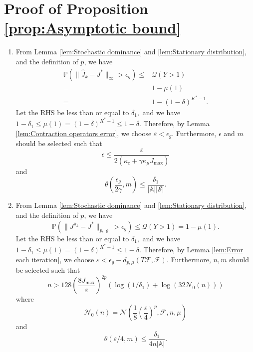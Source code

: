 \documentclass[12pt,technote,onecolumn]{IEEEtran}
\begin{document}
\section*{Proof of Proposition \ref{prop:Asymptotic bound}}
\begin{IEEEproof}
	\begin{enumerate}
		\item From Lemma \ref{lem:Stochastic dominance} and \ref{lem:Stationary distribution},
		and the definition of $p$, we have
		\begin{equation*}
		\begin{aligned}
		\mathbb{P}\left(\|\widehat{J}_{k}-J^{*}\|_{\infty}>\epsilon_{g}\right)
		\leq&\mathcal{\mathcal{Q}}\left(Y>1\right)\\
		=&1-\mu\left(1\right)\\
		=&1-\left(1-\delta\right)^{K^{*}-1}.
		\end{aligned}
		\end{equation*}
		Let the RHS be less than or equal to $\delta_{1},$ and we have $1-\delta_{1}\leq\mu\left(1\right)=\left(1-\delta\right)^{K^{*}-1}\leq1-\delta.$
		Therefore, by Lemma \ref{lem:Contraction operators error}, we choose
		$\varepsilon<\epsilon_{g}.$ Furthermore, $\epsilon$ and $m$
		should be selected such that
		\[
		\epsilon\leq\frac{\varepsilon}{2\left(\kappa_{c}+\gamma\kappa_{\mu}J_{\max}\right)}
		\]
		and 
		\[
		\theta\left(\frac{\epsilon_{g}}{2\gamma},m\right)\leq\frac{\delta_{1}}{\left|\mathbb{A}\right|\left|\mathcal{S}\right|}.
		\]
		\item From Lemma \ref{lem:Stochastic dominance} and \ref{lem:Stationary distribution},
		and the definition of $p$, we have
		\[
		\mathbb{P}\left(\|J^{\widehat{\pi}_{k}}-J^{*}\|_{p,\varrho}>\epsilon_{g}\right)\leq\mathcal{\mathcal{Q}}\left(Y>1\right)=1-\mu\left(1\right).
		\]
		Let the RHS be less than or equal to $\delta_{1},$ and we have $1-\delta_{1}\leq\mu\left(1\right)=\left(1-\delta\right)^{K^{*}-1}\leq1-\delta.$
		Therefore, by Lemma \ref{lem:Error each iteration}, we choose $\varepsilon<\epsilon_{g}-d_{p,\mu}\left(T\mathcal{F},\mathcal{F}\right).$
		Furthermore, $n,m$ should be selected such that
		\[
		n>128\left(\frac{8J_{\max}}{\varepsilon}\right)^{2p}\left(\log\left(1/\delta_{1}\right)+\log\left(32\mathcal{N}_{0}\left(n\right)\right)\right)
		\]
		where $$\mathcal{N}_{0}\left(n\right)=\mathcal{N}\left(\frac{1}{8}\left(\frac{\varepsilon}{4}\right)^{p},\mathcal{F},n,\mu\right)$$
		and 
		\[
		\theta\left(\varepsilon/4,m\right)\leq\frac{\delta_{1}}{4n\left|\mathbb{A}\right|}.
		\]
	\end{enumerate}
\end{IEEEproof}
\end{document}
